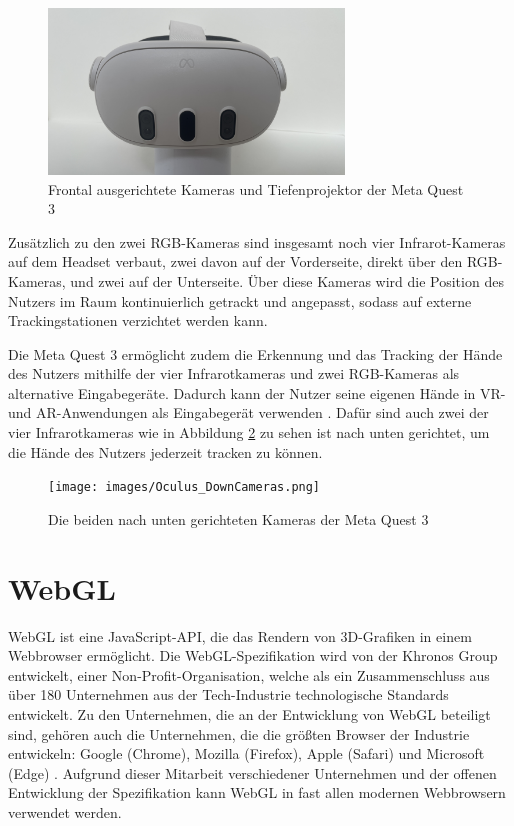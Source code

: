 \begin{figure}[H]
  \centering
  \includegraphics[width=0.7\textwidth]{images/Oculus-FrontCameras.jpg}
  \caption{Frontal ausgerichtete Kameras und Tiefenprojektor der Meta Quest 3}
  \label{fig:quest-front-cameras}
\end{figure}

Zusätzlich zu den zwei RGB-Kameras sind insgesamt noch vier Infrarot-Kameras auf dem Headset verbaut, zwei davon auf der Vorderseite, direkt über den RGB-Kameras, und zwei auf der Unterseite.
Über diese Kameras wird die Position des Nutzers im Raum kontinuierlich getrackt und angepasst, sodass auf externe Trackingstationen verzichtet werden kann.

Die Meta Quest 3 ermöglicht zudem die Erkennung und das Tracking der Hände des Nutzers mithilfe der vier Infrarotkameras und zwei RGB-Kameras als alternative Eingabegeräte.
Dadurch kann der Nutzer seine eigenen Hände in VR- und AR-Anwendungen als Eingabegerät verwenden \autocite[]{meta-quest-3}.
Dafür sind auch zwei der vier Infrarotkameras wie in Abbildung \ref{fig:quest-hand-cameras} zu sehen ist nach unten gerichtet, um die Hände des Nutzers jederzeit tracken zu können.

\begin{figure}[H]
  \centering
  \texttt{[image: images/Oculus\_DownCameras.png]}
  \caption{Die beiden nach unten gerichteten Kameras der Meta Quest 3}
  \label{fig:quest-hand-cameras}
\end{figure}


\section{WebGL}

WebGL ist eine JavaScript-API, die das Rendern von 3D-Grafiken in einem Webbrowser ermöglicht.
Die WebGL-Spezifikation wird von der Khronos Group entwickelt, einer Non-Profit-Organisation, welche als ein Zusammenschluss aus über 180 Unternehmen aus der Tech-Industrie technologische Standards entwickelt.
Zu den Unternehmen, die an der Entwicklung von WebGL beteiligt sind, gehören auch die Unternehmen, die die größten Browser der Industrie entwickeln: Google (Chrome), Mozilla (Firefox), Apple (Safari) und Microsoft (Edge) \autocite[]{khronos-webgl, khronos-about}.
Aufgrund dieser Mitarbeit verschiedener Unternehmen und der offenen Entwicklung der Spezifikation kann WebGL in fast allen modernen Webbrowsern verwendet werden.

